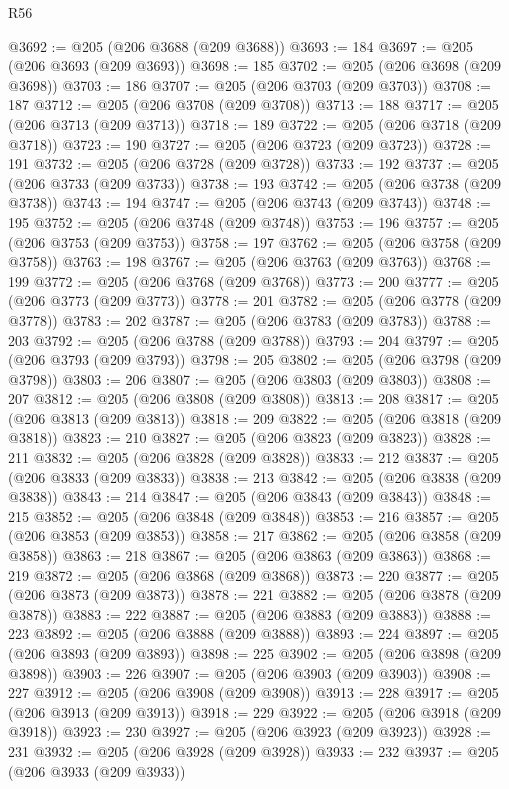 \begin{lexlean}{R56}
\begin{coremodule}
@3692 := @205 (@206 @3688 (@209 @3688))
@3693 := 184
@3697 := @205 (@206 @3693 (@209 @3693))
@3698 := 185
@3702 := @205 (@206 @3698 (@209 @3698))
@3703 := 186
@3707 := @205 (@206 @3703 (@209 @3703))
@3708 := 187
@3712 := @205 (@206 @3708 (@209 @3708))
@3713 := 188
@3717 := @205 (@206 @3713 (@209 @3713))
@3718 := 189
@3722 := @205 (@206 @3718 (@209 @3718))
@3723 := 190
@3727 := @205 (@206 @3723 (@209 @3723))
@3728 := 191
@3732 := @205 (@206 @3728 (@209 @3728))
@3733 := 192
@3737 := @205 (@206 @3733 (@209 @3733))
@3738 := 193
@3742 := @205 (@206 @3738 (@209 @3738))
@3743 := 194
@3747 := @205 (@206 @3743 (@209 @3743))
@3748 := 195
@3752 := @205 (@206 @3748 (@209 @3748))
@3753 := 196
@3757 := @205 (@206 @3753 (@209 @3753))
@3758 := 197
@3762 := @205 (@206 @3758 (@209 @3758))
@3763 := 198
@3767 := @205 (@206 @3763 (@209 @3763))
@3768 := 199
@3772 := @205 (@206 @3768 (@209 @3768))
@3773 := 200
@3777 := @205 (@206 @3773 (@209 @3773))
@3778 := 201
@3782 := @205 (@206 @3778 (@209 @3778))
@3783 := 202
@3787 := @205 (@206 @3783 (@209 @3783))
@3788 := 203
@3792 := @205 (@206 @3788 (@209 @3788))
@3793 := 204
@3797 := @205 (@206 @3793 (@209 @3793))
@3798 := 205
@3802 := @205 (@206 @3798 (@209 @3798))
@3803 := 206
@3807 := @205 (@206 @3803 (@209 @3803))
@3808 := 207
@3812 := @205 (@206 @3808 (@209 @3808))
@3813 := 208
@3817 := @205 (@206 @3813 (@209 @3813))
@3818 := 209
@3822 := @205 (@206 @3818 (@209 @3818))
@3823 := 210
@3827 := @205 (@206 @3823 (@209 @3823))
@3828 := 211
@3832 := @205 (@206 @3828 (@209 @3828))
@3833 := 212
@3837 := @205 (@206 @3833 (@209 @3833))
@3838 := 213
@3842 := @205 (@206 @3838 (@209 @3838))
@3843 := 214
@3847 := @205 (@206 @3843 (@209 @3843))
@3848 := 215
@3852 := @205 (@206 @3848 (@209 @3848))
@3853 := 216
@3857 := @205 (@206 @3853 (@209 @3853))
@3858 := 217
@3862 := @205 (@206 @3858 (@209 @3858))
@3863 := 218
@3867 := @205 (@206 @3863 (@209 @3863))
@3868 := 219
@3872 := @205 (@206 @3868 (@209 @3868))
@3873 := 220
@3877 := @205 (@206 @3873 (@209 @3873))
@3878 := 221
@3882 := @205 (@206 @3878 (@209 @3878))
@3883 := 222
@3887 := @205 (@206 @3883 (@209 @3883))
@3888 := 223
@3892 := @205 (@206 @3888 (@209 @3888))
@3893 := 224
@3897 := @205 (@206 @3893 (@209 @3893))
@3898 := 225
@3902 := @205 (@206 @3898 (@209 @3898))
@3903 := 226
@3907 := @205 (@206 @3903 (@209 @3903))
@3908 := 227
@3912 := @205 (@206 @3908 (@209 @3908))
@3913 := 228
@3917 := @205 (@206 @3913 (@209 @3913))
@3918 := 229
@3922 := @205 (@206 @3918 (@209 @3918))
@3923 := 230
@3927 := @205 (@206 @3923 (@209 @3923))
@3928 := 231
@3932 := @205 (@206 @3928 (@209 @3928))
@3933 := 232
@3937 := @205 (@206 @3933 (@209 @3933))

\end{coremodule}
\end{lexlean}
